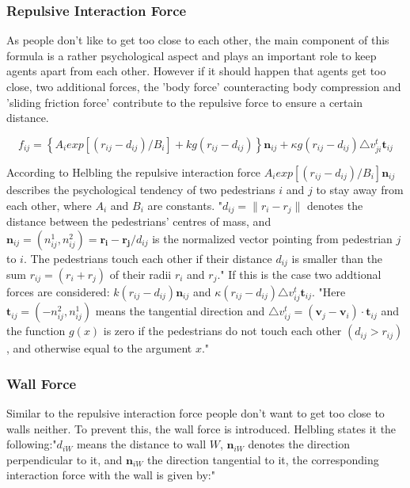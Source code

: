 \documentclass[11pt]{article}
\begin{document}
\subsubsection{Repulsive Interaction Force}

As people don't like to get too close to each other, the main component of this
formula is a rather psychological aspect and plays an important role to keep
agents apart from each other. However if it should happen that agents get too
close, two additional forces, the 'body force' counteracting body compression
and 'sliding friction force' contribute to the repulsive force to ensure a
certain distance. \cite{SDFEP} 

\begin{equation}
f_{ij}=\left\{A_{i}exp[(r_{ij}-d_{ij})/B_{i}]+kg(r_{ij}-d_{ij})\right\}\mathbf{n}_{ij}+\kappa g(r_{ij}-d_{ij})\triangle v_{ji}^t\mathbf{t}_{ij}
\end{equation}

According to Helbling the repulsive interaction force $A_{i}exp[(r_{ij}-d_{ij})/B_{i}]\mathbf{n}_{ij}$ describes the psychological tendency of two pedestrians $i$ and $j$ to stay away from each other, where $A_i$ and $B_i$ are constants. 
"$d_{ij}=\|r_i-r_j\|$ denotes the distance between the pedestrians' centres of mass, and $\mathbf{n}_{ij}=(n_{ij}^1, n_{ij}^2)=\mathbf{r_i}-\mathbf{r_j}/d_{ij}$ is the normalized vector pointing from pedestrian $j$ to $i$.
The pedestrians touch each other if their distance $d_{ij}$ is smaller than the sum $r_{ij}=(r_i+r_j)$ of their radii $r_i$ and $r_j$."\cite{SDFEP}
If this is the case two addtional forces are considered:
$k(r_{ij}-d_{ij})\mathbf{n}_{ij}$ and $\kappa(r_{ij}-d_{ij})\triangle
v_{ij}^t\mathbf{t}_{ij}$. "Here $\mathbf{t}_{ij}=(-n_{ij}^2,n_{ij}^1)$ means
the tangential direction and $\triangle
v_{ij}^t=(\mathbf{v}_j-\mathbf{v}_i)\cdot\mathbf{t}_{ij}$ and the function
$g(x)$ is zero if the pedestrians do not touch each other $(d_{ij}>r_{ij})$,
and otherwise equal to the argument $x$."\cite{SDFEP}

\subsubsection{Wall Force}
Similar to the repulsive interaction force people don't want to get too close to walls neither. To prevent this, the wall force is introduced.
Helbling states it the following:"$d_{iW}$ means the distance to wall $W$, $\mathbf{n}_{iW}$ denotes  the direction perpendicular to it, and $\mathbf{n}_{iW}$ the direction tangential to it, the corresponding interaction force with the wall is given by:" \cite{SFMPD}
\end{document}
